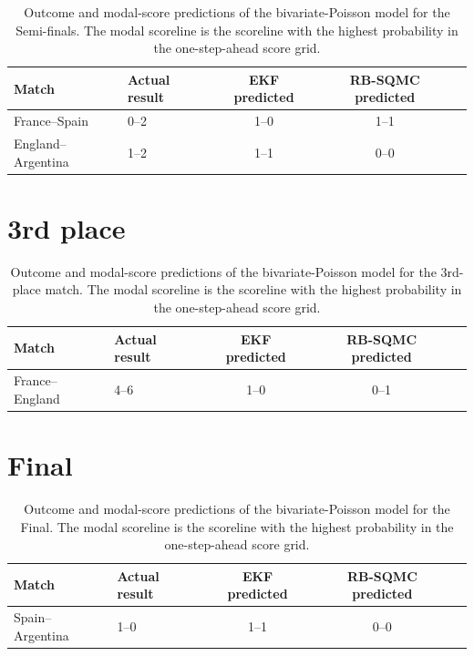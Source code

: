 \begin{table}[H]
\centering
\begin{tabular}{llccc}
\toprule
Match & Actual result & EKF predicted & RB-SQMC predicted \\
\midrule
France--Spain & 0--2 & 1--0 & 1--1 \\
England--Argentina & 1--2 & 1--1 & 0--0 \\
\bottomrule
\end{tabular}
\caption{Outcome and modal-score predictions of the bivariate-Poisson model for the Semi-finals. The modal scoreline is the scoreline with the highest probability in the one-step-ahead score grid.}
\end{table}

\section{3rd place}

\begin{table}[H]
\centering
\begin{tabular}{llccc}
\toprule
Match & Actual result & EKF predicted & RB-SQMC predicted \\
\midrule
France--England & 4--6 & 1--0 & 0--1 \\
\bottomrule
\end{tabular}
\caption{Outcome and modal-score predictions of the bivariate-Poisson model for the 3rd-place match. The modal scoreline is the scoreline with the highest probability in the one-step-ahead score grid.}
\end{table}

\section{Final}

\begin{table}[H]
\centering
\begin{tabular}{llccc}
\toprule
Match & Actual result & EKF predicted & RB-SQMC predicted \\
\midrule
Spain--Argentina & 1--0 & 1--1 & 0--0 \\
\bottomrule
\end{tabular}
\caption{Outcome and modal-score predictions of the bivariate-Poisson model for the Final. The modal scoreline is the scoreline with the highest probability in the one-step-ahead score grid.}
\end{table}

